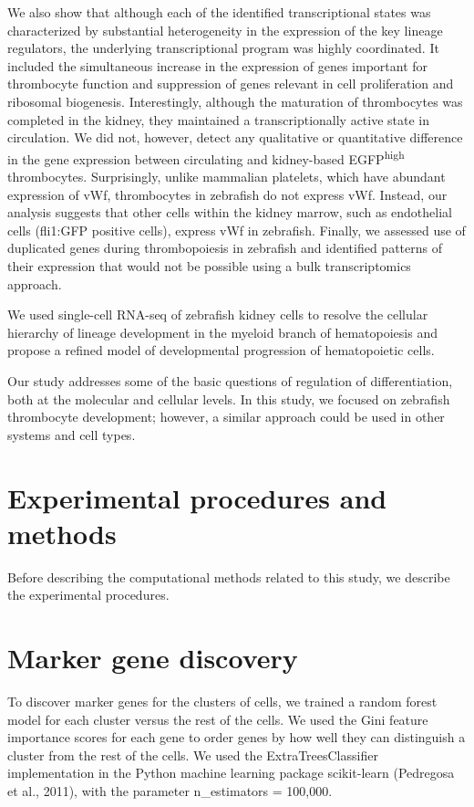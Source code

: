We also show that although each of the identified transcriptional states was characterized by substantial heterogeneity in the expression of the key lineage regulators, the underlying transcriptional program was highly coordinated. It included the simultaneous increase in the expression of genes important
for thrombocyte function and suppression of genes relevant in cell proliferation and ribosomal biogenesis. Interestingly, although the maturation of thrombocytes was completed in the kidney, they maintained a transcriptionally active state in circulation. We did not, however, detect any qualitative or quantitative difference in the gene expression between circulating and kidney-based EGFP\textsuperscript{high} thrombocytes. Surprisingly, unlike mammalian platelets, which have abundant expression of vWf, thrombocytes in zebrafish do not express vWf. Instead, our analysis suggests that other cells within the kidney marrow, such as endothelial cells (fli1:GFP positive cells), express vWf in zebrafish. Finally, we assessed use of duplicated genes during thrombopoiesis in zebrafish and identified patterns of their expression that would not be possible using a bulk transcriptomics approach.

We used single-cell RNA-seq of zebrafish kidney cells to resolve the cellular hierarchy of lineage development in the myeloid branch of hematopoiesis and propose a refined model of developmental progression of hematopoietic cells.

Our study addresses some of the basic questions of regulation of differentiation, both at the molecular and cellular levels. In this study, we focused on zebrafish thrombocyte development; however, a similar approach could be used in other systems and cell types.

\section{Experimental procedures and methods}

Before describing the computational methods related to this study, we describe the experimental procedures.

\section{Marker gene discovery}

To discover marker genes for the clusters of cells, we trained a random forest model for each cluster versus the rest of the cells. We used the Gini feature importance scores for each gene to order genes by how well they can distinguish a cluster from the rest of the cells. We used the ExtraTreesClassifier  \cite{Geurts2006-qg} implementation in the Python machine learning package scikit-learn (Pedregosa et al., 2011), with the parameter n\_estimators = 100,000.
              
